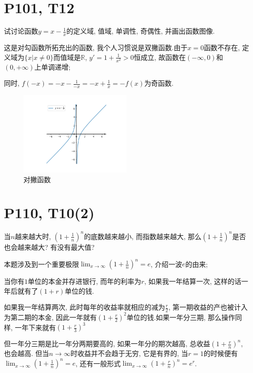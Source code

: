 \documentclass{book}
\begin{document}
    \section{\textcolor[rgb]{0.11,0.65,0.52}{P101, T12}}
    \begin{boxB}
        试讨论函数$\displaystyle y=x-\frac{1}{x}$的定义域, 值域, 单调性, 奇偶性, 并画出函数图像.
    \end{boxB}
    这是对勾函数所拓充出的函数, 我个人习惯说是双撇函数.由于$x=0$函数不存在, 定义域为$\{x|x\neq 0\}$而值域是$\mathbb{R}$, $y'=1+\frac{1}{x^2}>0$恒成立, 故函数在$(-\infty ,0)$和$(0,+\infty )$上单调递增;
        
    同时, $\displaystyle f(-x)=-x-\frac{1}{-x}=-x+\frac{1}{x}=-f(x)$为奇函数.
    \begin{figure}[htbp]
        \centering
        \includegraphics[width=0.5\textwidth]{img/sp.png}
        \caption{对撇函数}
    \end{figure}
    \section{\textcolor[rgb]{0.11,0.65,0.52}{P110, T10(2)}}
    \begin{boxB}
        当$n$越来越大时, $\displaystyle (1+\frac{1}{n})^{n}$的底数越来越小, 而指数越来越大, 那么$\displaystyle (1+\frac{1}{n})^{n}$是否也会越来越大? 有没有最大值?
    \end{boxB}
    本题涉及到一个重要极限$\displaystyle \lim_{x \to \infty} (1+\frac{1}{n} )^n=e$, 介绍一波$e$的由来;

    当你有$1$单位的本金并存进银行, 而年的利率为$r$, 如果我一年结算一次, 这样的话一年后就有了$(1+r)$单位的钱.

    如果我一年结算两次, 此时每年的收益率就相应的减为$\displaystyle \frac{r}{2}$, 第一期收益的产也被计入为第二期的本金, 因此一年就有$\displaystyle (1+\frac{r}{2})^2$单位的钱.如果一年分三期, 那么操作同样, 一年下来就有$\displaystyle (1+\frac{r}{3})^3$

    但一年分三期是比一年分两期要高的, 如果一年分的期次越高, 总收益$\displaystyle (1+\frac{r}{n})^n$, 也会越高. 但当$n\to \infty$时收益并不会趋于无穷, 它是有界的, 当$r=1$的时候便有$\displaystyle \lim_{x \to \infty} (1+\frac{1}{n} )^n=e$, 还有一般形式$\displaystyle \lim_{x \to \infty} (1+\frac{r}{n} )^n=e^r$. 
\end{document}
